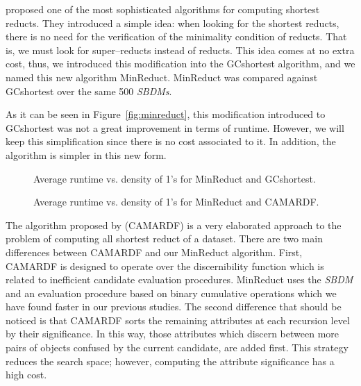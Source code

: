 \documentclass[authoryear,11pt]{elsarticle}
\begin{document}
 \cite{Zhou2009} proposed one of the most sophisticated algorithms for computing shortest reducts. They introduced a simple idea: when looking for the shortest reducts, there is no need for the verification of the minimality condition of reducts. That is, we must look for super--reducts instead of reducts. This idea comes at no extra cost, thus, we introduced this modification into the GCshortest algorithm, and we named this new algorithm MinReduct. MinReduct was compared against GCshortest over the same 500 \textit{SBDMs}.
 
 As it can be seen in Figure~\ref{fig:minreduct}, this modification introduced to GCshortest was not a great improvement in terms of runtime. However, we will keep this simplification since there is no cost associated to it. In addition, the algorithm is simpler in this new form. 
 
   \begin{figure}[htb]
   	\begin{minipage}{.48\linewidth}  	
   		\begin{center}
   		\end{center}
   		\caption{Average runtime vs. density of 1's for MinReduct and GCshortest.}
   		\label{fig:minreduct}
   	\end{minipage}
   	\begin{minipage}{.48\linewidth}  
   		\begin{center}
   		\end{center}
   		\caption{Average runtime vs. density of 1's for MinReduct and CAMARDF.}
   		\label{fig:camardf}
   	\end{minipage}
   \end{figure}
   
   The algorithm proposed by \cite{Zhou2009} (CAMARDF) is a very elaborated approach to the problem of computing all shortest reduct of a dataset. There are two main differences between CAMARDF  and our MinReduct algorithm. First, CAMARDF is designed to operate over the discernibility function which is related to inefficient candidate evaluation procedures. MinReduct uses the \textit{SBDM} and an evaluation procedure based on binary cumulative operations which we have found faster in our previous studies. The second difference that should be noticed is that CAMARDF sorts the remaining attributes at each recursion level by their significance. In this way, those attributes which discern between more pairs of objects confused by the current candidate, are added first. This strategy reduces the search space; however, computing the attribute significance has a high cost.
   
\end{document}
